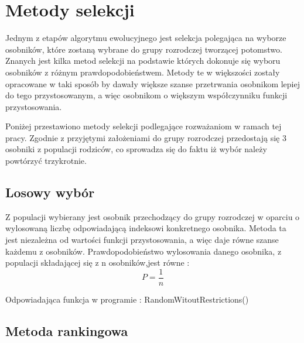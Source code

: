 \chapter{Metody selekcji}\label{cha:pierwszyDokument}

Jednym z etapów algorytmu ewolucyjnego jest selekcja polegająca na wyborze osobników, które zostaną wybrane do grupy rozrodczej tworzącej potomstwo. Znanych jest kilka metod selekcji na podstawie których dokonuje się wyboru osobników z różnym prawdopodobieństwem. Metody te w większości zostały opracowane w taki sposób by dawały większe szanse przetrwania osobnikom lepiej do tego przystosowanym, a więc osobnikom o większym współczynniku funkcji przystosowania. 

Poniżej przestawiono metody selekcji podlegające rozważaniom w ramach tej pracy. Zgodnie z przyjętymi założeniami do grupy rozrodczej przedostają się 3 osobniki z populacji rodziców, co sprowadza się do faktu iż wybór należy powtórzyć trzykrotnie.



\section{Losowy wybór}\label{sec:strukturaDokumentu}

Z populacji wybierany jest osobnik przechodzący do grupy rozrodczej w oparciu o  wylosowaną liczbę odpowiadającą indeksowi konkretnego osobnika. Metoda ta jest niezależna od wartości funkcji przystosowania, a więc daje równe szanse każdemu z osobników. Prawdopodobieństwo wylosowania danego osobnika, z populacji składającej się z n osobników,jest równe :
\vspace{0,4cm}
$$
P = \frac{1}{n}
$$

\par
Odpowiadająca funkcja w programie : RandomWitoutRestrictions()


\section{Metoda rankingowa}\label{sec:kompilacja}


